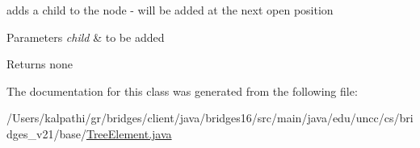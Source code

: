 adds a child to the node -\/ will be added at the next open position


\begin{DoxyParams}{Parameters}
{\em child} & to be added\\
\hline
\end{DoxyParams}
\begin{DoxyReturn}{Returns}
none 
\end{DoxyReturn}


The documentation for this class was generated from the following file\+:\begin{DoxyCompactItemize}
\item 
/\+Users/kalpathi/gr/bridges/client/java/bridges16/src/main/java/edu/uncc/cs/bridges\+\_\+v21/base/\hyperlink{_tree_element_8java}{Tree\+Element.\+java}\end{DoxyCompactItemize}
